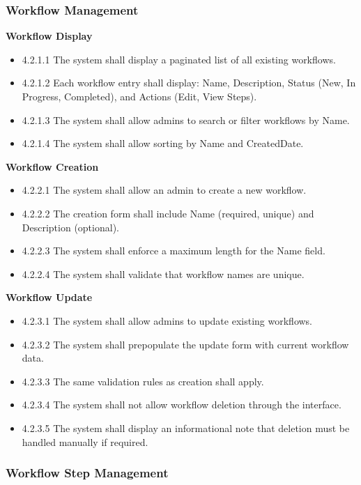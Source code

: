 \documentclass[12pt]{article}
\begin{document}
\subsubsection{Workflow Management}

\textbf{Workflow Display}
\begin{itemize}
    \item 4.2.1.1 The system shall display a paginated list of all existing workflows.
    \item 4.2.1.2 Each workflow entry shall display: Name, Description, Status (New, In
    Progress, Completed), and Actions (Edit, View Steps).
    \item 4.2.1.3 The system shall allow admins to search or filter workflows by Name.
    \item 4.2.1.4 The system shall allow sorting by Name and CreatedDate.
\end{itemize}

\textbf{Workflow Creation}
\begin{itemize}
    \item 4.2.2.1 The system shall allow an admin to create a new workflow.
    \item 4.2.2.2 The creation form shall include Name (required, unique) and Description
    (optional).
    \item 4.2.2.3 The system shall enforce a maximum length for the Name field.
    \item 4.2.2.4 The system shall validate that workflow names are unique.
\end{itemize}

\textbf{Workflow Update}
\begin{itemize}
    \item 4.2.3.1 The system shall allow admins to update existing workflows.
    \item 4.2.3.2 The system shall prepopulate the update form with current workflow data.
    \item 4.2.3.3 The same validation rules as creation shall apply.
    \item 4.2.3.4 The system shall not allow workflow deletion through the interface.
    \item 4.2.3.5 The system shall display an informational note that deletion must be handled
    manually if required.
\end{itemize}

\subsubsection{Workflow Step Management}
\end{document}
